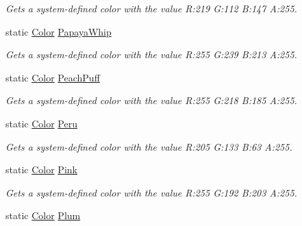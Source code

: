 \begin{DoxyCompactItemize}
\begin{DoxyCompactList}\small\item\em Gets a system-\/defined color with the value R\+:219 G\+:112 B\+:147 A\+:255.\end{DoxyCompactList}\item 
static \hyperlink{structMicrosoft_1_1Xna_1_1Framework_1_1Color}{Color} \hyperlink{structMicrosoft_1_1Xna_1_1Framework_1_1Color_aa02776ad5ff7fcb6877f48dfecc83d1a}{Papaya\+Whip}
\begin{DoxyCompactList}\small\item\em Gets a system-\/defined color with the value R\+:255 G\+:239 B\+:213 A\+:255.\end{DoxyCompactList}\item 
static \hyperlink{structMicrosoft_1_1Xna_1_1Framework_1_1Color}{Color} \hyperlink{structMicrosoft_1_1Xna_1_1Framework_1_1Color_adb9b6b6cd4cb596511b686cee3b006f3}{Peach\+Puff}
\begin{DoxyCompactList}\small\item\em Gets a system-\/defined color with the value R\+:255 G\+:218 B\+:185 A\+:255.\end{DoxyCompactList}\item 
static \hyperlink{structMicrosoft_1_1Xna_1_1Framework_1_1Color}{Color} \hyperlink{structMicrosoft_1_1Xna_1_1Framework_1_1Color_a36e5c7e5c45475fd4b0ef0d24c5a6a72}{Peru}
\begin{DoxyCompactList}\small\item\em Gets a system-\/defined color with the value R\+:205 G\+:133 B\+:63 A\+:255.\end{DoxyCompactList}\item 
static \hyperlink{structMicrosoft_1_1Xna_1_1Framework_1_1Color}{Color} \hyperlink{structMicrosoft_1_1Xna_1_1Framework_1_1Color_ae30ac30d637ea4e65a888acc784667a4}{Pink}
\begin{DoxyCompactList}\small\item\em Gets a system-\/defined color with the value R\+:255 G\+:192 B\+:203 A\+:255.\end{DoxyCompactList}\item 
static \hyperlink{structMicrosoft_1_1Xna_1_1Framework_1_1Color}{Color} \hyperlink{structMicrosoft_1_1Xna_1_1Framework_1_1Color_a9a657ba240cf4d7bc20b7dcf9e40b6f4}{Plum}

\end{DoxyCompactItemize}
